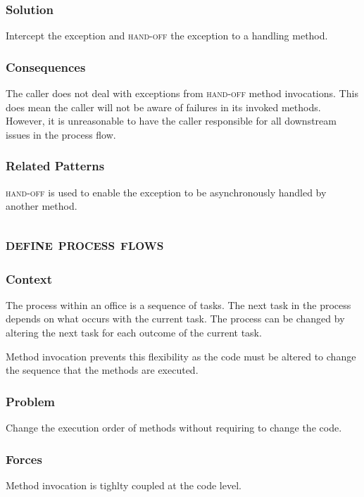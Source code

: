 \documentclass[prodmode]{style/acmlarge}
\begin{document}
\subsubsection*{Solution} Intercept the exception and \textsc{hand-off} the
exception to a handling method.

\subsubsection*{Consequences} The caller does not deal with exceptions from
\textsc{hand-off} method invocations.  This does mean the caller will not be
aware of failures in its invoked methods.  However, it is unreasonable to have
the caller responsible for all downstream issues in the process flow.

\subsubsection*{Related Patterns} \textsc{hand-off} is used to enable the
exception to be asynchronously handled by another method.



\subsection{\textsc{\textbf{define process flows}}}

\subsubsection*{Context} The process within an office is a sequence of tasks.
The next task in the process depends on what occurs with the current task.  The
process can be changed by altering the next task for each outcome of the current
task.

Method invocation prevents this flexibility as the code must be altered to
change the sequence that the methods are executed.

\subsubsection*{Problem} Change the execution order of methods without requiring
to change the code.

\subsubsection*{Forces} Method invocation is tighlty coupled at the code level.
\end{document}
